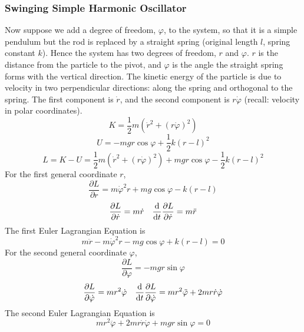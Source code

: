 \documentclass[a4paper,12pt,titlepage]{article}
\begin{document}
\subsubsection{Swinging Simple Harmonic Oscillator}
Now suppose we add a degree of freedom, $\varphi$, to the system, so that it is a simple pendulum but the rod is replaced by a straight spring (original length $l$, spring constant $k$). Hence the system has two degrees of freedom, $r$ and $\varphi$. $r$ is the distance from the particle to the pivot, and $\varphi$ is the angle the straight spring forms with the vertical direction. The kinetic energy of the particle is due to velocity in two perpendicular directions: along the spring and orthogonal to the spring. The first component is $\dot r$, and the second component is $r\dot\varphi$ (recall: velocity in polar coordinates).
\[K=\frac{1}{2}m(\dot r^2+(r\dot\varphi)^2)\]
\[U=-mgr\cos\varphi+\frac{1}{2}k(r-l)^2\]
\[L=K-U=\frac{1}{2}m(\dot r^2+(r\dot\varphi)^2)+mgr\cos\varphi-\frac{1}{2}k(r-l)^2\]
For the first general coordinate $r$,
\[\frac{\partial L}{\partial r}=m\dot\varphi^2r+mg\cos\varphi-k(r-l)\]
\[\frac{\partial L}{\partial \dot r}=m\dot r\quad \frac{\mathrm{d}}{\mathrm{d} t}\frac{\partial L}{\partial \dot r}=m\ddot r\]
The first Euler Lagrangian Equation is
\[m\ddot r-m\dot\varphi^2 r-mg\cos\varphi+k(r-l)=0\]
For the second general coordinate $\varphi$,
\[\frac{\partial L}{\partial \varphi}=-mgr\sin\varphi\]
\[\frac{\partial L}{\partial\dot\varphi}=mr^2\dot\varphi\quad\frac{\mathrm{d}}{\mathrm{d} t}\frac{\partial L}{\partial\dot\varphi}=mr^2\ddot\varphi+2mr\dot r\dot\varphi\]
The second Euler Lagrangian Equation is
\[mr^2\ddot\varphi+2mr\dot r\dot\varphi+mgr\sin\varphi=0\]
\end{document}

